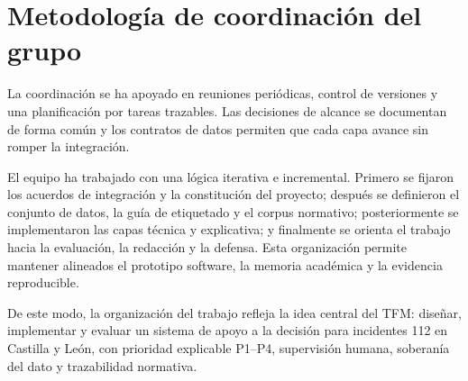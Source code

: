\section{Metodología de coordinación del grupo}

La coordinación se ha apoyado en reuniones periódicas, control de versiones y una planificación por tareas trazables. Las decisiones de alcance se documentan de forma común y los contratos de datos permiten que cada capa avance sin romper la integración.

El equipo ha trabajado con una lógica iterativa e incremental. Primero se fijaron los acuerdos de integración y la constitución del proyecto; después se definieron el conjunto de datos, la guía de etiquetado y el corpus normativo; posteriormente se implementaron las capas técnica y explicativa; y finalmente se orienta el trabajo hacia la evaluación, la redacción y la defensa. Esta organización permite mantener alineados el prototipo software, la memoria académica y la evidencia reproducible.

De este modo, la organización del trabajo refleja la idea central del TFM: diseñar, implementar y evaluar un sistema de apoyo a la decisión para incidentes 112 en Castilla y León, con prioridad explicable P1--P4, supervisión humana, soberanía del dato y trazabilidad normativa.

\setcounter{secnumdepth}{2}
